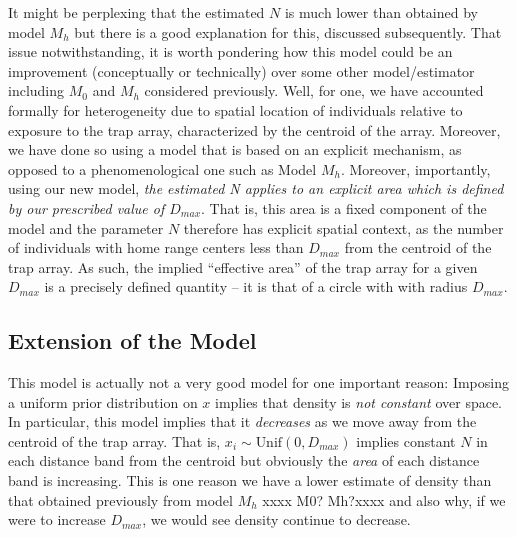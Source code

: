 It might be 
perplexing that the estimated $N$ is much lower than obtained by model
$M_h$ but there is a good explanation for this, discussed
subsequently. That issue notwithstanding, it is worth pondering how
this model could be an improvement (conceptually or technically) over
some other model/estimator including $M_0$ and $M_h$ considered
previously. Well, for one, we have accounted formally for
heterogeneity due to spatial location of individuals relative to
exposure to the trap array, characterized by the centroid of the
array. Moreover, we have done so using a model that is based on an
explicit mechanism, as opposed to a phenomenological one such as Model
$M_h$. Moreover, importantly, using our new model, {\it the estimated N
  applies to an explicit area which is defined by our prescribed value
  of $D_{max}$}. That is, this area is a fixed component of the model and
the parameter $N$ therefore has explicit spatial context, as the number
of individuals with home range centers less than $D_{max}$ from the
centroid of the trap array. As such, the implied ``effective 
area'' of the trap array for a given $D_{max}$ is a precisely defined
quantity -- it is that of a circle with with radius
$D_{max}$. 


\subsection{Extension of the Model}

This model is actually not a very good model for one important reason:
Imposing a uniform prior distribution on $x$ implies that density is
{\it not constant} over space. In particular, this model implies that
it {\it decreases} as we move away from the centroid of the trap
array.  That is, $x_{i} \sim \mbox{Unif}(0,D_{max})$ implies constant
$N$ in each distance band from the centroid but obviously the {\it
  area} of each distance band is increasing.  This is one reason we
have a lower estimate of density than that obtained previously from
model $M_h$ xxxx M0? Mh?xxxx and also why, if we were to increase $D_{max}$, we would
see density continue to decrease.

